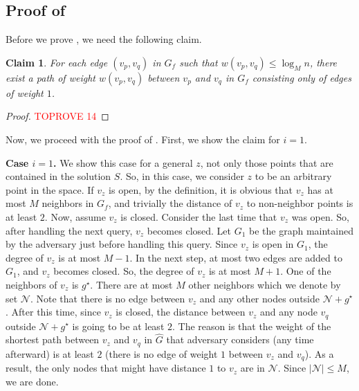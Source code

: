 \documentclass[11pt]{article}
\newcommand{\1}{\mathmybb{1}}
\newtheorem{claim}[theorem]{Claim}
\begin{document}
\subsection{Proof of }\label{sec:bound-on-neighbors}

Before we prove , we need the following claim.

\begin{claim}\label{lem:path-of-length-1-edges}
    For each edge $(v_p,v_q)$ in $G_f$ such that $w(v_p,v_q) \leq \log_M n$, there exist a path of weight $w(v_p,v_q)$ between $v_p$ and $v_q$ in $G_f$ consisting only of edges of weight $1$.
\end{claim}


\begin{proof}\textcolor{red}{TOPROVE 14}\end{proof}


Now, we proceed with the proof of .
First, we show the claim for $i = 1$.

\medskip
\noindent \textbf{Case $i=1$.} We show this case for a general $z$, not only those points that are contained in the solution $S$. So, in this case, we consider $z$ to be an arbitrary point in the space.
If $v_z$ is open, by the definition, it is obvious that $v_z$ has at most $M$ neighbors in $G_f$, and trivially the distance of $v_z$ to non-neighbor points is at least $2$.
Now, assume $v_z$ is closed. 
Consider the last time that $v_z$ was open.
So, after handling the next query, $v_z$ becomes closed.
Let $G_1$ be the graph maintained by the adversary just before handling this query.
Since $v_z$ is open in $G_1$, the degree of $v_z$ is at most $M-1$.
In the next step, at most two edges are added to $G_1$, and $v_z$ becomes closed.
So, the degree of $v_z$ is at most $M+1$.
One of the neighbors of $v_z$ is $g^\star$.
There are at most $M$ other neighbors which we denote by set $\mathcal{N}$.
Note that there is no edge between $v_z$ and any other nodes outside $\mathcal{N} + g^\star$.
After this time, since $v_z$ is closed, the distance between $v_z$ and any node $v_q$ outside $\mathcal{N}+g^\star$ is going to be at least $2$.
The reason is that the weight of the shortest path between $v_z$ and $v_q$ in $\widehat G$ that adversary considers (any time afterward) is at least $2$ (there is no edge of weight $1$ between $v_z$ and $v_q$).
As a result, the only nodes that might have distance $1$ to $v_z$ are in $\mathcal{N}$.
Since $|\mathcal{N}| \leq M$, we are done.
\end{document}
